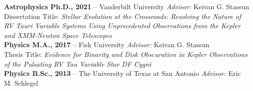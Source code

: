 \documentclass[letter,12pt]{article}
\begin{document}
\noindent\textbf{Astrophysics Ph.D., 2021} -- Vanderbilt University \hfill \textit{Advisor:} Keivan G. Stassun \\
\hspace*{1cm}Dissertation Title: {\it Stellar Evolution at the Crossroads: Resolving the Nature of RV Tauri Variable Systems Using Unprecedented Observations from the Kepler and XMM-Newton Space Telescopes} \\
\textbf{Physics M.A., 2017} -- Fisk University \hfill \textit{Advisor:} Keivan G. Stassun \\
\hspace*{1cm}Thesis Title: {\it Evidence for Binarity and Disk Obscuration in Kepler Observations of the Pulsating RV Tau Variable Star DF Cygni} \\
\textbf{Physics B.Sc., 2013} -- The University of Texas at San Antonio \hfill \textit{Advisor:} Eric M. Schlegel \\
\end{document}
